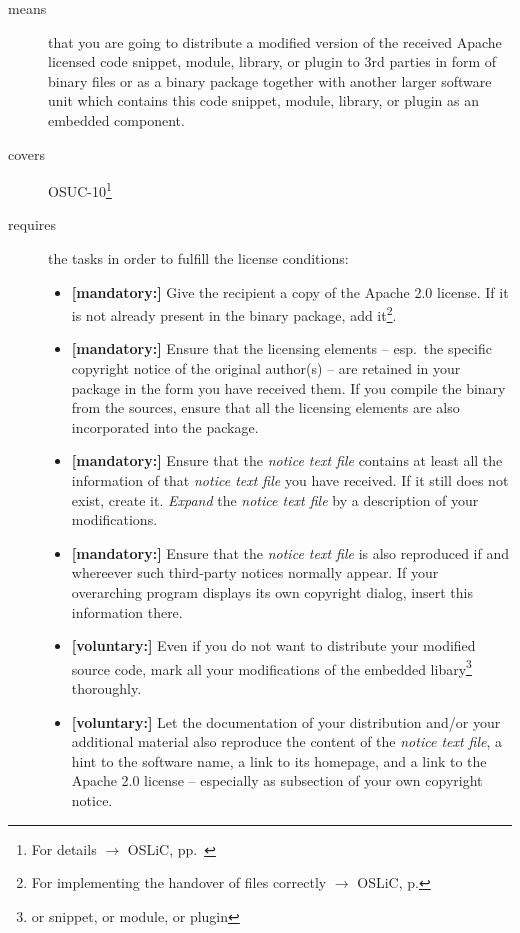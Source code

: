 \begin{description}
\item[means] that you are going to distribute a modified version of the received
Apache licensed code snippet, module, library, or plugin to 3rd parties in form
of binary files or as a binary package together with another larger software
unit which contains this code snippet, module, library, or plugin as an embedded
component.
\item[covers] OSUC-10\footnote{For details $\rightarrow$ OSLiC, pp.\ \pageref{OSUC-10-DEF}}
\item[requires] the tasks in order to fulfill the license conditions:
\begin{itemize}
  
  \item \textbf{[mandatory:]} Give the recipient a copy of the Apache 2.0
  license. If it is not already present in the binary package, add
  it\footnote{For implementing the handover of files correctly $\rightarrow$
  OSLiC, p. \pageref{DistributingFilesHint}}.
  
  \item \textbf{[mandatory:]} Ensure that the licensing elements -- esp.\ the
  specific copyright notice of the original author(s) -- are retained in your
  package in the form you have received them. If you compile the binary from the
  sources, ensure that all the licensing elements are also incorporated into the
  package.
  
  \item \textbf{[mandatory:]} Ensure that the \emph{notice text file} contains
  at least all the information of that \emph{notice text file} you have
  received.  If it still does not exist, create it. \emph{Expand} the
  \emph{notice text file} by a description of your modifications.
 
  \item \textbf{[mandatory:]} Ensure that the \emph{notice text file} is also
  reproduced if and whereever such third-party notices normally appear. If your
  overarching program displays its own copyright dialog, insert this information
  there.
     
  \item \textbf{[voluntary:]} Even if you do not want to distribute your
  modified source code, mark all your modifications of the embedded
  libary\footnote{or snippet, or module, or plugin} thoroughly.
 
  \item \textbf{[voluntary:]} Let the documentation of your distribution and/or
  your additional material also reproduce the content of the \emph{notice text
  file}, a hint to the software name, a link to its homepage, and a link to the
  Apache 2.0 license -- especially as subsection of your own copyright notice.
  

\end{itemize}
\end{description}
